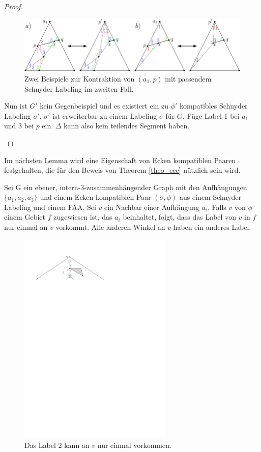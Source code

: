 \begin{proof}
\begin{description}[leftmargin =0pt, font = \bfseries]
\begin{figure}[h]
	\centering
	  \includegraphics[width=1\textwidth]{lem3_2.png}
    	\caption{Zwei Beispiele zur Kontraktion von $(a_1,p)$ mit passendem Schnyder Labeling im zweiten Fall.}
    	\label{pic_lem3_2}
\end{figure}

Nun ist $G'$ kein Gegenbeispiel und es existiert ein zu $\phi'$ kompatibles Schnyder Labeling $\sigma'$. $\sigma'$ ist erweiterbar zu einem Labeling $\sigma$ für $G$. Füge Label 1 bei $a_1$ und 3 bei $p$ ein. $\Delta$ kann also kein teilendes Segment haben.
\end{description}
\end{proof}

Im nächsten Lemma wird eine Eigenschaft von Ecken kompatiblen Paaren festgehalten, die für den Beweis von Theorem \ref{theo_ccc} nützlich sein wird.

\begin{lemma}\label{lem4}
Sei G ein ebener, intern-3-zusammenhängender Graph mit den Aufhängungen $\{a_1,a_2,a_3\}$ und einem Ecken kompatiblen Paar $(\sigma,\phi)$ aus einem Schnyder Labeling und einem FAA. Sei $v$ ein Nachbar einer Aufhängung $a_i$. Falls $v$ von $\phi$ einem Gebiet $f$ zugewiesen ist, das $a_i$ beinhaltet, folgt, dass das Label von $v$ in $f$ nur einmal an $v$ vorkommt. Alle anderen Winkel an $v$ haben ein anderes Label.
\end{lemma}

\begin{figure}[h]
\centering
\includegraphics[width=0.65\textwidth]{lem4.pdf}
\caption{Das Label 2 kann an $v$ nur einmal vorkommen.}
\label{lem4}
\centering
\end{figure}

